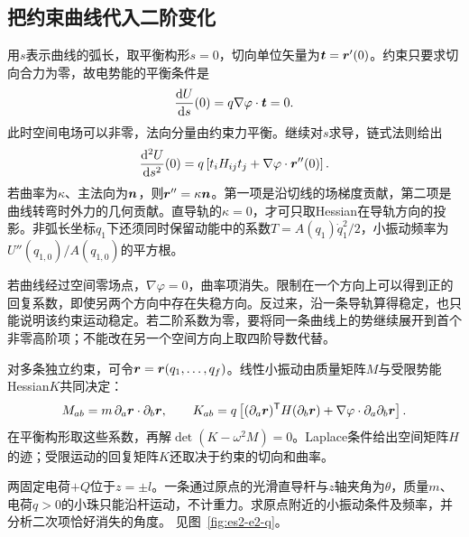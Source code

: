 \subsection{把约束曲线代入二阶变化}\label{sec:es-constrained-hessian}
用$s$表示曲线的弧长，取平衡构形$s=0$，切向单位矢量为$\bm{t}=\bm{r}'(0)$。约束只要求切向合力为零，故电势能的平衡条件是
\[\frac{\mathop{}\!\mathrm d U}{\mathop{}\!\mathrm d s}(0)=q\nabla\varphi\cdot\bm{t}=0.
\]
此时空间电场可以非零，法向分量由约束力平衡。继续对$s$求导，链式法则给出
\[\frac{\mathop{}\!\mathrm d^2U}{\mathop{}\!\mathrm d s^2}(0)
=q\left[t_iH_{ij}t_j+\nabla\varphi\cdot\bm{r}''(0)\right].
\]
若曲率为$\kappa$、主法向为$\bm{n}$，则$\bm{r}''=\kappa\bm{n}$。第一项是沿切线的场梯度贡献，第二项是曲线转弯时外力的几何贡献。直导轨的$\kappa=0$，才可只取Hessian在导轨方向的投影。非弧长坐标$q_1$下还须同时保留动能中的系数$T=A(q_1)\dot q_1^2/2$，小振动频率为$U''(q_{1,0})/A(q_{1,0})$的平方根。

若曲线经过空间零场点，$\nabla\varphi=0$，曲率项消失。限制在一个方向上可以得到正的回复系数，即使另两个方向中存在失稳方向。反过来，沿一条导轨算得稳定，也只能说明该约束运动稳定。若二阶系数为零，要将同一条曲线上的势继续展开到首个非零高阶项；不能改在另一个空间方向上取四阶导数代替。

对多条独立约束，可令$\bm{r}=\bm{r}(q_1,\ldots,q_f)$。线性小振动由质量矩阵$M$与受限势能Hessian$K$共同决定：
\[M_{ab}=m\,\partial_a\bm{r}\cdot\partial_b\bm{r},
\qquad K_{ab}=q\left[(\partial_a\bm{r})^{\mathsf T}H(\partial_b\bm{r})
+\nabla\varphi\cdot\partial_a\partial_b\bm{r}\right].
\]
在平衡构形取这些系数，再解$\det(K-\omega^2M)=0$。Laplace条件给出空间矩阵$H$的迹；受限运动的回复矩阵$K$还取决于约束的切向和曲率。


\begin{example}[斜导杆上带电小珠]\label{ex:es2-e2}
两固定电荷$+Q$位于$z=\pm l$。一条通过原点的光滑直导杆与$z$轴夹角为$\theta$，质量$m$、电荷$q>0$的小珠只能沿杆运动，不计重力。求原点附近的小振动条件及频率，并分析二次项恰好消失的角度。 见图~\ref{fig:es2-e2-q}。
\end{example}

